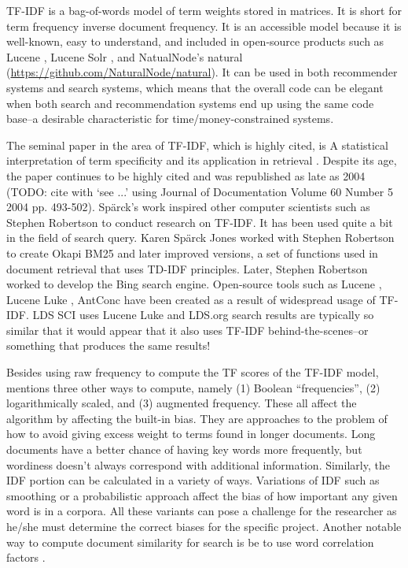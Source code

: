 TF-IDF is a bag-of-words model of term weights stored in matrices. It is short for term frequency inverse document frequency.  It is an accessible model because it is well-known, easy to understand, and included in open-source products such as Lucene \citep{McCandless:2010:LAS:1893016}, Lucene Solr \citep{apache_solr_beginners_guide_2013,apache_solr_enterprise_search_server_2015}, and NatualNode’s natural (\url{https://github.com/NaturalNode/natural}).  It can be used in both recommender systems and search systems, which means that the overall code can be elegant when both search and recommendation systems end up using the same code base--a desirable characteristic for time/money-constrained systems.

The seminal paper in the area of TF-IDF, which is highly cited, is A statistical interpretation of term specificity and its application in retrieval \citep{sparck1972statistical}. Despite its age, the paper continues to be highly cited and was republished as late as 2004 (TODO: cite with `see ...' using Journal of Documentation Volume 60 Number 5 2004 pp. 493-502). Spärck’s work inspired other computer scientists such as Stephen Robertson to conduct research on TF-IDF. It has been used quite a bit in the field of search query. Karen Spärck Jones worked with Stephen Robertson to create Okapi BM25 and later improved versions, a set of functions used in document retrieval that uses TD-IDF principles. Later, Stephen Robertson worked to develop the Bing search engine. Open-source tools such as Lucene \citep{McCandless:2010:LAS:1893016}, Lucene Luke \citep{lucene:luke}, AntConc \citep{anthony_2013} have been created as a result of widespread usage of TF-IDF. LDS SCI uses Lucene Luke and LDS.org search results are typically so similar that it would appear that it also uses TF-IDF behind-the-scenes--or something that produces the same results!

Besides using raw frequency to compute the TF scores of the TF-IDF model, \citet{manning_raghavan_2008_scoring} mentions three other ways to compute, namely (1) Boolean ``frequencies'', (2) logarithmically scaled, and (3) augmented frequency. These all affect the algorithm by affecting the built-in bias. They are approaches to the problem of how to avoid giving excess weight to terms found in longer documents. Long documents have a better chance of having key words more frequently, but wordiness doesn’t always correspond with additional information.  Similarly, the IDF portion can be calculated in a variety of ways. Variations of IDF such as smoothing or a probabilistic approach affect the bias of how important any given word is in a corpora. All these variants can pose a challenge for the researcher as he/she must determine the correct biases for the specific project. Another notable way to compute document similarity for search is be to use word correlation factors \citep{won2007using}.

